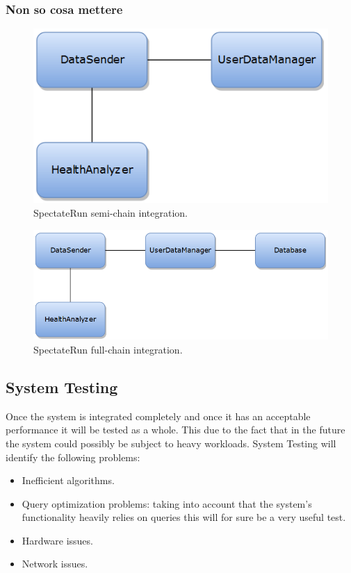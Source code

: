 \subsubsection{Non so cosa mettere}
\begin{figure}[H]
\centering
\includegraphics[scale=0.7]{Images/IntegrationPlanImages/fig19.png}
\caption{SpectateRun semi-chain integration.}
\end{figure}

\begin{figure}[H]
\centering
\includegraphics[scale=0.7]{Images/IntegrationPlanImages/fig20.png}
\caption{SpectateRun full-chain integration.}
\end{figure}



\subsection{System Testing}
Once the system is integrated completely and once it has an acceptable performance it will be tested as a whole. This due to the fact that in the future the system could possibly be subject to heavy workloads. System Testing will identify the following problems:

\begin{itemize}
\item Inefficient algorithms.
\item Query optimization problems: taking into account that the system's functionality heavily relies on queries this will for sure be a very useful test.
\item Hardware issues.
\item Network issues.
\end{itemize}

